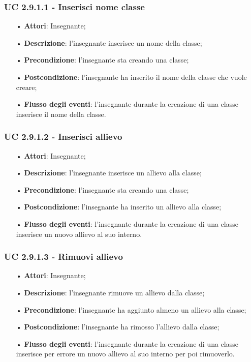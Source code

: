 \subsubsection{UC 2.9.1.1 - Inserisci nome classe}
\begin{itemize}
	\item[•] \textbf{Attori}: Insegnante;
	\item[•] \textbf{Descrizione}: l'insegnante inserisce un nome della classe;
	\item[•] \textbf{Precondizione}: l'insegnante sta creando una classe;
	\item[•] \textbf{Postcondizione}: l'insegnante ha inserito il nome della classe che vuole creare;
	\item[•] \textbf{Flusso degli eventi}: l'insegnante durante la creazione di una classe inserisce il nome della classe.
\end{itemize}

\subsubsection{UC 2.9.1.2 - Inserisci allievo}
\begin{itemize}
	\item[•] \textbf{Attori}: Insegnante;
	\item[•] \textbf{Descrizione}: l'insegnante inserisce un allievo alla classe;
	\item[•] \textbf{Precondizione}: l'insegnante sta creando una classe;
	\item[•] \textbf{Postcondizione}: l'insegnante ha inserito un allievo alla classe;
	\item[•] \textbf{Flusso degli eventi}: l'insegnante durante la creazione di una classe inserisce un nuovo allievo al suo interno.
\end{itemize}

\subsubsection{UC 2.9.1.3 - Rimuovi allievo}
\begin{itemize}
	\item[•] \textbf{Attori}: Insegnante;
	\item[•] \textbf{Descrizione}: l'insegnante rimuove un allievo dalla classe;
	\item[•] \textbf{Precondizione}: l'insegnante ha aggiunto almeno un allievo alla classe;
	\item[•] \textbf{Postcondizione}: l'insegnante ha rimosso l'allievo dalla classe;
	\item[•] \textbf{Flusso degli eventi}: l'insegnante durante la creazione di una classe inserisce per errore un nuovo allievo al suo interno per poi rimuoverlo.
\end{itemize}


